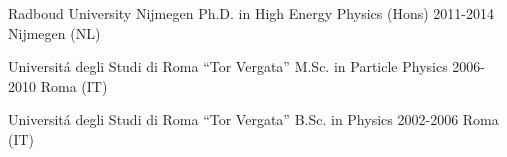 

\begin{cveducations}

\cveducation
{Radboud University Nijmegen} %
{Ph.D. in High Energy Physics (Hons)} %
{2011-2014} %
{Nijmegen (NL)} %
{\PhdThesis} %
\skipV

\cveducation
{Universit\'a degli Studi di Roma ``Tor Vergata''} %
{M.Sc. in Particle Physics} %
{2006-2010} %
{Roma (IT)} %
{\MsThesis} %
\skipV

\cveducation
{Universit\'a degli Studi di Roma ``Tor Vergata''} %
{B.Sc. in Physics} %
{2002-2006} %
{Roma (IT)} %
{\BsThesis} %
\skipV

\end{cveducations}
